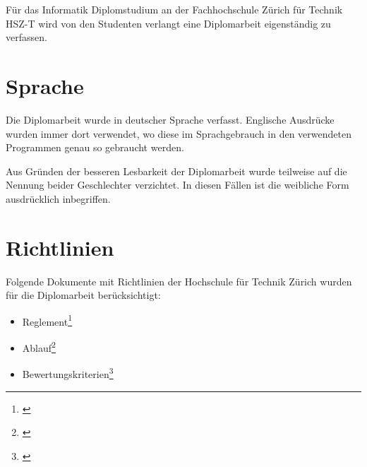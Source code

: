 Für das Informatik Diplomstudium an der Fachhochschule Zürich für Technik
HSZ-T wird von den Studenten verlangt eine Diplomarbeit eigenständig zu
verfassen.

\section{Sprache}
Die Diplomarbeit wurde in deutscher Sprache verfasst. Englische Ausdrücke 
wurden immer dort verwendet, wo diese im Sprachgebrauch in den verwendeten 
Programmen genau so gebraucht werden.

Aus Gründen der besseren Lesbarkeit der Diplomarbeit wurde teilweise auf 
die Nennung beider Geschlechter verzichtet. In diesen Fällen ist die 
weibliche Form ausdrücklich inbegriffen.
  
\section{Richtlinien}
Folgende Dokumente mit Richtlinien der Hochschule für Technik Zürich 
wurden für die Diplomarbeit berücksichtigt:

\begin{itemize}
    \item Reglement\footnote{\citealp*[Vgl.][ganzes Dokument]{hsz_reglement}}
    \item Ablauf\footnote{\citealp*[Vgl.][ganzes Dokument]{hsz_ablauf}}
    \item Bewertungskriterien\footnote{\citealp*[Vgl.][ganzes Dokument]{hsz_bewertungskriterien}}
\end{itemize}
